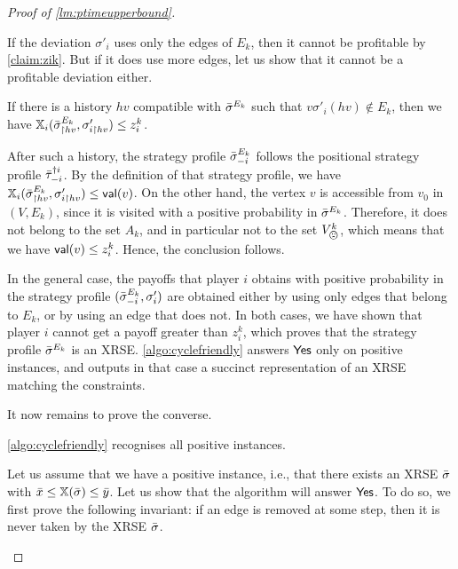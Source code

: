 \begin{proof}[Proof of \cref{lm:ptimeupperbound}]
\begin{claimproof}
        If the deviation $\sigma'_i$ uses only the edges of $E_k$, then it cannot be profitable by \cref{claim:zik}.
        But if it does use more edges, let us show that it cannot be a profitable deviation either.
 
\begin{claim}
    If there is a history $hv$ compatible with ${\bar{\sigma}}^{E_k}$ such that $v\sigma'_i(hv) \not\in E_k$, then we have $\mathbb{X}_i({\bar{\sigma}}^{E_k}_{\upharpoonright hv}, \sigma'_{i\upharpoonright hv}) \leq z_i^k$.
\end{claim}

\begin{claimproof}
    After such a history, the strategy profile ${\bar{\sigma}}^{E_k}_{-i}$ follows the positional strategy profile ${\bar{\tau}}^{\dag i}_{-i}$.
    By the definition of that strategy profile, we have $\mathbb{X}_i({\bar{\sigma}}^{E_k}_{\upharpoonright hv}, \sigma'_{i\upharpoonright hv}) \leq \mathsf{val}(v)$.
    On the other hand, the vertex $v$ is accessible from $v_0$ in $(V, E_k)$, since it is visited with a positive probability in ${\bar{\sigma}}^{E_k}$.
    Therefore, it does not belong to the set $A_k$, and in particular not to the set $V_\bad^k$, which means that we have $\mathsf{val}(v) \leq z_i^k$.
    Hence, the conclusion follows. 
\end{claimproof}



 
In the general case, the payoffs that player $i$ obtains with positive probability in the strategy profile $({\bar{\sigma}}^{E_k}_{-i}, \sigma'_i)$ are obtained either by using only edges that belong to $E_k$, or by using an edge that does not. In both cases, we have shown that player $i$ cannot get a payoff greater than $z_i^k$, which proves that the strategy profile ${\bar{\sigma}}^{E_k}$ is an XRSE.
\cref{algo:cyclefriendly} answers $\mathsf{Yes}$ only on positive instances, and outputs in that case a succinct representation of an XRSE matching the constraints.
\end{claimproof}

It now remains to prove the converse.
 
            \begin{proposition}
                \cref{algo:cyclefriendly} recognises all positive instances. 
            \end{proposition}
    
            \begin{claimproof}
           Let us assume that we have a positive instance, i.e., that there exists an XRSE ${\bar{\sigma}}$ with ${\bar{x}} \leq \mathbb{X}({\bar{\sigma}}) \leq {\bar{y}}$.
        Let us show that the algorithm will answer $\mathsf{Yes}$.
        To do so, we first prove the following invariant: if an edge is removed at some step, then it is never taken by the XRSE ${\bar{\sigma}}$.


\end{claimproof}
\end{proof}
